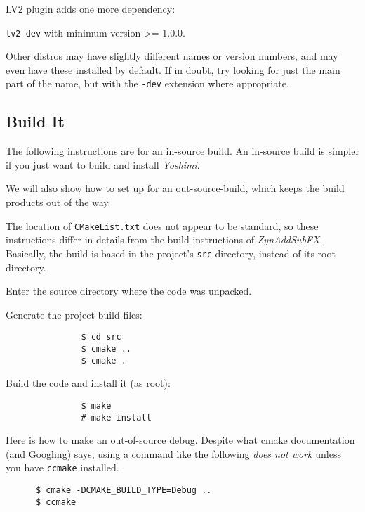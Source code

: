 	LV2 plugin adds one more dependency:

		\texttt{lv2-dev} with minimum version >= 1.0.0.

   Other distros may have slightly different names or version numbers, and may
   even have these installed by default. If in doubt, try looking for just the
   main part of the name, but with the \texttt{-dev} extension where
   appropriate.

\subsection{Build It}
\label{subsec:yoshimi_build_it}

   The following instructions are for an in-source build.  An in-source
   build is simpler if you just want to build and install \textsl{Yoshimi}.

   We will also show how to set up for an out-source-build, which keeps
   the build products out of the way.

   The location of \texttt{CMakeList.txt} does not appear to be standard, so
   these instructions differ in details from the build instructions of
   \textsl{ZynAddSubFX}.  Basically, the build is based in the project's
   \texttt{src} directory, instead of its root directory.

   \begin{enumber}
      \item Enter the source directory where the code was unpacked.
      \item Generate the project build-files:
            \begin{verbatim}
               $ cd src
               $ cmake ..
               $ cmake .
            \end{verbatim}
      \item Build the code and install it (as root):
            \begin{verbatim}
               $ make
               # make install
            \end{verbatim}
   \end{enumber}

   Here is how to make an out-of-source debug.  Despite what
   cmake documentation (and Googling) says, using a command like the
   following \textsl{does not work} unless you have \texttt{ccmake}
   installed.

   \begin{verbatim}
      $ cmake -DCMAKE_BUILD_TYPE=Debug ..
      $ ccmake
   \end{verbatim}
   

